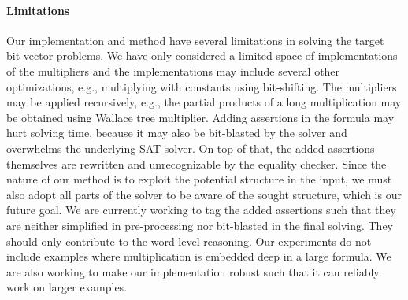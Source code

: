 \paragraph{\bf Limitations}
%
Our implementation and method have several limitations
in solving the target bit-vector problems.
%
We have only considered a limited space of implementations of the
multipliers and the implementations may include several other
optimizations, e.g., multiplying with constants using bit-shifting.
%
The multipliers may be applied recursively, e.g.,
the partial products of a long multiplication may be
obtained using Wallace tree multiplier.
%
Adding assertions in the formula may hurt solving time, because
it may also be bit-blasted by the solver and overwhelms
the underlying SAT solver. 
%
On top of that, the added assertions themselves are rewritten and
unrecognizable by the equality checker.
%
Since the nature of our method is to exploit the potential
structure in the input, we must also adopt all parts of the solver
to be aware of the sought structure, which is our future goal.
%
We are currently working to tag the added assertions such that they
are neither simplified in pre-processing nor bit-blasted in the final
solving.
%
They should only contribute to the word-level reasoning.
%
Our experiments do not include examples where multiplication
is embedded deep in a large formula.
%
We are also working to make our implementation robust such that
it can reliably work on larger examples.







